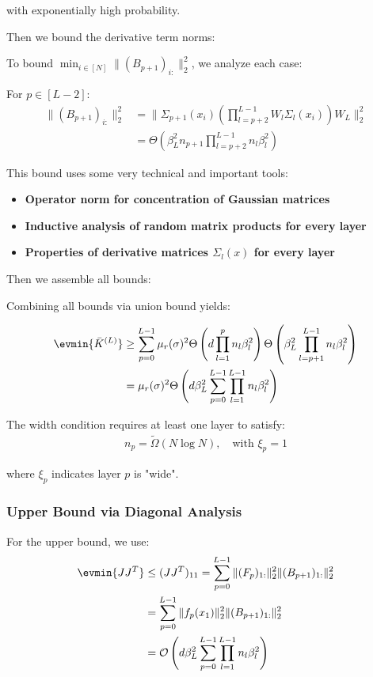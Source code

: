 with exponentially high probability.

Then we bound the derivative term norms:

To bound $\min_{i \in [N]} \|(B_{p+1})_{i:}\|_2^2$, we analyze each case:

For $p \in [L-2]$:
\begin{align}
\|(B_{p+1})_{i:}\|_2^2 &= \|\Sigma_{p+1}(x_i) \left(\prod_{l=p+2}^{L-1} W_l \Sigma_l(x_i)\right) W_L\|_2^2 \\
&= \Theta\left(\beta_L^2 n_{p+1} \prod_{l=p+2}^{L-1} n_l \beta_l^2\right)
\end{align}

This bound uses some very technical and important tools:
\begin{itemize}
    \item \textbf{Operator norm for  concentration of Gaussian matrices}
    \item \textbf{Inductive analysis of random matrix products for every layer}
    \item \textbf{Properties of derivative matrices $\Sigma_l(x)$ for every layer}
\end{itemize}

Then we assemble all bounds:

Combining all bounds via union bound yields:

\begin{align}
\evmin{\bar{K}^{(L)}} &\geq \sum_{p=0}^{L-1} \mu_r(\sigma)^2 \Theta\left(d \prod_{l=1}^p n_l \beta_l^2\right) \Theta\left(\beta_L^2 \prod_{l=p+1}^{L-1} n_l \beta_l^2\right) \\
&= \mu_r(\sigma)^2 \Theta\left(d \beta_L^2 \sum_{p=0}^{L-1} \prod_{l=1}^{L-1} n_l \beta_l^2\right)
\end{align}

The width condition requires at least one layer to satisfy:
\begin{align}
n_p = \tilde{\Omega}(N \log N), \quad \text{with } \xi_p = 1
\end{align}

where $\xi_p$ indicates layer $p$ is "wide".

\subsubsection{Upper Bound via Diagonal Analysis}

For the upper bound, we use:
\begin{align}
\evmin{JJ^T} &\leq (JJ^T)_{11} = \sum_{p=0}^{L-1} \|(F_p)_{1:}\|_2^2 \|(B_{p+1})_{1:}\|_2^2 \\
&= \sum_{p=0}^{L-1} \|f_p(x_1)\|_2^2 \|(B_{p+1})_{1:}\|_2^2 \\
&= \mathcal{O}\left(d \beta_L^2 \sum_{p=0}^{L-1} \prod_{l=1}^{L-1} n_l \beta_l^2\right)
\end{align}


